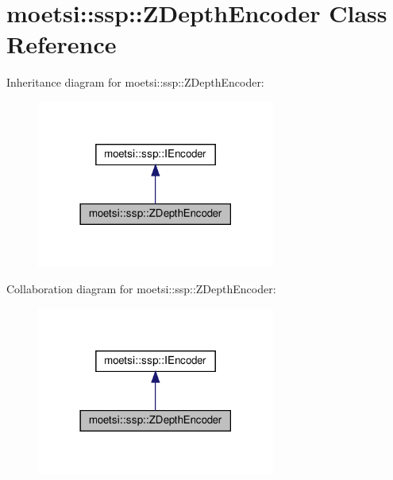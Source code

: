 \hypertarget{classmoetsi_1_1ssp_1_1ZDepthEncoder}{}\section{moetsi\+:\+:ssp\+:\+:Z\+Depth\+Encoder Class Reference}
\label{classmoetsi_1_1ssp_1_1ZDepthEncoder}


Inheritance diagram for moetsi\+:\+:ssp\+:\+:Z\+Depth\+Encoder\+:\nopagebreak
\begin{figure}[H]
\begin{center}
\leavevmode
\includegraphics[width=222pt]{classmoetsi_1_1ssp_1_1ZDepthEncoder__inherit__graph}
\end{center}
\end{figure}


Collaboration diagram for moetsi\+:\+:ssp\+:\+:Z\+Depth\+Encoder\+:\nopagebreak
\begin{figure}[H]
\begin{center}
\leavevmode
\includegraphics[width=222pt]{classmoetsi_1_1ssp_1_1ZDepthEncoder__coll__graph}
\end{center}
\end{figure}
